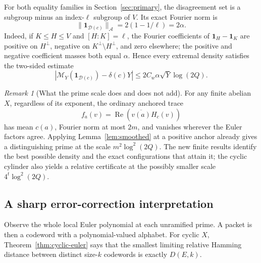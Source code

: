 \documentclass[11pt]{article}
\theoremstyle{definition}
\theoremstyle{remark}
\newtheorem{remark}[theorem]{Remark}
\newcommand{\one}{\mathbf1}
\begin{document}
For both equality families in Section~\ref{sec:primary}, the disagreement set is a subgroup minus an index-$\ell$ subgroup of $V$. Its exact Fourier norm is
\[
 \|\one_{\mathcal D(c)}\|_{\mathcal A}=2(1-1/\ell)=2\alpha.
\]
Indeed, if $K\le H\le V$ and $[H:K]=\ell$, the Fourier coefficients of $\one_H-\one_K$ are positive on $H^\perp$, negative on $K^\perp\setminus H^\perp$, and zero elsewhere; the positive and negative coefficient masses both equal $\alpha$. Hence every extremal density satisfies the two-sided estimate
\[
 \left|\mathcal M_Y(\one_{\mathcal D(c)})-\delta(c)Y\right|
 \le2C_w\alpha\sqrt Y\log(2Q).
\]

\begin{remark}[What the prime scale does and does not add]\label{rem:standard-scale}
For any finite abelian $X$, regardless of its exponent, the ordinary anchored trace
\[
 f_a(v)=\operatorname{Re}\left(\overline{v(a)}H_c(v)\right)
\]
has mean $c(a)$, Fourier norm at most $2m$, and vanishes wherever the Euler factors agree. Applying Lemma~\ref{lem:smoothed} at a positive anchor already gives a distinguishing prime at the scale $m^2\log^2(2Q)$. The new finite results identify the best possible density and the exact configurations that attain it; the cyclic cylinder also yields a relative certificate at the possibly smaller scale $4^t\log^2(2Q)$.
\end{remark}

\subsection{A sharp error-correction interpretation}
Observe the whole local Euler polynomial at each unramified prime. A packet is then a codeword with a polynomial-valued alphabet. For cyclic $X$, Theorem~\ref{thm:cyclic-euler} says that the smallest limiting relative Hamming distance between distinct size-$k$ codewords is exactly $D(E,k)$.
\end{document}
